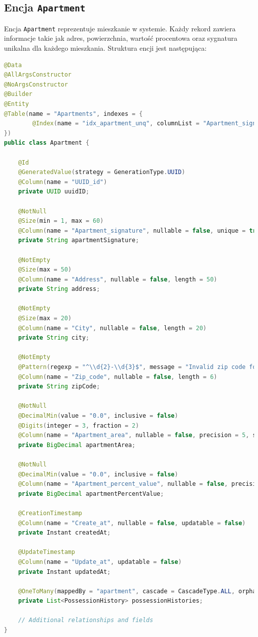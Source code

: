 \subsection{Encja \texttt{Apartment}}

Encja \texttt{Apartment} reprezentuje mieszkanie w systemie. Każdy rekord zawiera informacje takie jak adres, powierzchnia, wartość procentowa oraz sygnatura unikalna dla każdego mieszkania. Struktura encji jest następująca:

\begin{lstlisting}[language=Java, style=JavaStyle, caption=Encja mieszkania \texttt{Apartment}]
@Data
@AllArgsConstructor
@NoArgsConstructor
@Builder
@Entity
@Table(name = "Apartments", indexes = {
        @Index(name = "idx_apartment_unq", columnList = "Apartment_signature", unique = true)
})
public class Apartment {

    @Id
    @GeneratedValue(strategy = GenerationType.UUID)
    @Column(name = "UUID_id")
    private UUID uuidID;

    @NotNull
    @Size(min = 1, max = 60)
    @Column(name = "Apartment_signature", nullable = false, unique = true, length = 60)
    private String apartmentSignature;

    @NotEmpty
    @Size(max = 50)
    @Column(name = "Address", nullable = false, length = 50)
    private String address;

    @NotEmpty
    @Size(max = 20)
    @Column(name = "City", nullable = false, length = 20)
    private String city;

    @NotEmpty
    @Pattern(regexp = "^\\d{2}-\\d{3}$", message = "Invalid zip code format")
    @Column(name = "Zip_code", nullable = false, length = 6)
    private String zipCode;

    @NotNull
    @DecimalMin(value = "0.0", inclusive = false)
    @Digits(integer = 3, fraction = 2)
    @Column(name = "Apartment_area", nullable = false, precision = 5, scale = 2)
    private BigDecimal apartmentArea;

    @NotNull
    @DecimalMin(value = "0.0", inclusive = false)
    @Column(name = "Apartment_percent_value", nullable = false, precision = 5, scale = 2)
    private BigDecimal apartmentPercentValue;

    @CreationTimestamp
    @Column(name = "Create_at", nullable = false, updatable = false)
    private Instant createdAt;

    @UpdateTimestamp
    @Column(name = "Update_at", updatable = false)
    private Instant updatedAt;

    @OneToMany(mappedBy = "apartment", cascade = CascadeType.ALL, orphanRemoval = true)
    private List<PossessionHistory> possessionHistories;

    // Additional relationships and fields
}
\end{lstlisting}

